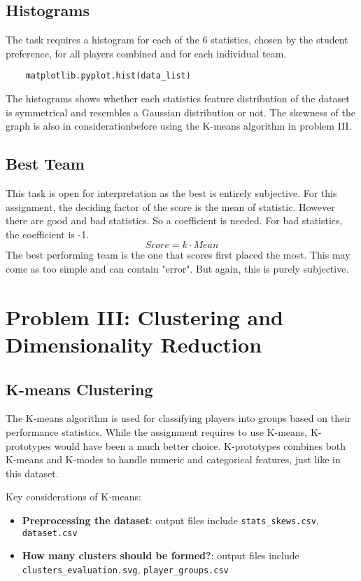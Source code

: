 \documentclass{report}
\begin{document}
\subsection{Histograms}
The task requires a histogram for each of the 6 statistics, chosen by the student preference, for all
players combined and for each individual team.
\begin{verbatim}
    matplotlib.pyplot.hist(data_list)
\end{verbatim}
The histograms shows whether each statistics feature distribution of the dataset is symmetrical 
and resembles a Gaussian distribution or not. The skewness of the graph is also in considerationbefore 
using the K-means algorithm in problem III. 

\subsection{Best Team}
This task is open for interpretation as the best is entirely subjective. For this assignment, the 
deciding factor of the score is the mean of statistic. However there are good and bad statistics. 
So a coefficient is needed. For bad statistics, the coefficient is -1.
\[Score = k \cdot Mean\]
The best performing team is the one that scores first placed the most.
This may come as too simple and can contain "error". But again, this is purely subjective.

\section{Problem III: Clustering and Dimensionality Reduction}
\subsection{K-means Clustering}
The K-means algorithm is used for classifying players into groups based on their performance statistics.
While the assignment requires to use K-means, K-prototypes would have been a much better choice.
K-prototypes combines both K-means and K-modes to handle numeric and categorical features, just
like in this dataset. 

Key considerations of K-means:
\begin{itemize}
    \item \textbf{Preprocessing the dataset}: output files include \verb|stats_skews.csv|, 
    \verb|dataset.csv|
    \item \textbf{How many clusters should be formed?}: output files include 
    \verb|clusters_evaluation.svg|, \verb|player_groups.csv|
\end{itemize}
\end{document}
